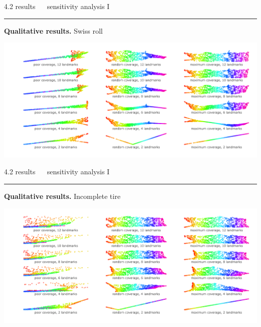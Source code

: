 \documentclass[11pt, compress, t, notes = noshow, xcolor = table, 
aspectratio = 1610]{beamer}
\begin{document}
\LARGE
\begin{frame}{\textcolor{gray!90}{4.2 results} ~~ sensitivity analysis I}
\normalsize
\vspace{-0.5cm}
\noindent \textcolor{gray!90}{\rule{\textwidth}{1pt}}
\smallskip

\textbf{Qualitative results.} Swiss roll

\vspace{0.3cm}

\includegraphics[trim = 40 10 0 0, clip, %
    width = \textwidth]{figures/sensitivity_landmarks_qual_swiss}

\end{frame}


\LARGE
\begin{frame}{\textcolor{gray!90}{4.2 results} ~~ sensitivity analysis I}
\normalsize
\vspace{-0.5cm}
\noindent \textcolor{gray!90}{\rule{\textwidth}{1pt}}
\smallskip

\textbf{Qualitative results.} Incomplete tire

\vspace{0.3cm}

\includegraphics[trim = 40 10 0 0, clip, %
    width = \textwidth]{figures/sensitivity_landmarks_qual_tire}

\end{frame}
\end{document}
